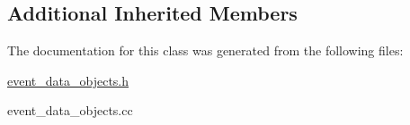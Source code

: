\subsection*{Additional Inherited Members}


The documentation for this class was generated from the following files\+:\begin{DoxyCompactItemize}
\item 
\mbox{\hyperlink{event__data__objects_8h}{event\+\_\+data\+\_\+objects.\+h}}\item 
event\+\_\+data\+\_\+objects.\+cc\end{DoxyCompactItemize}
